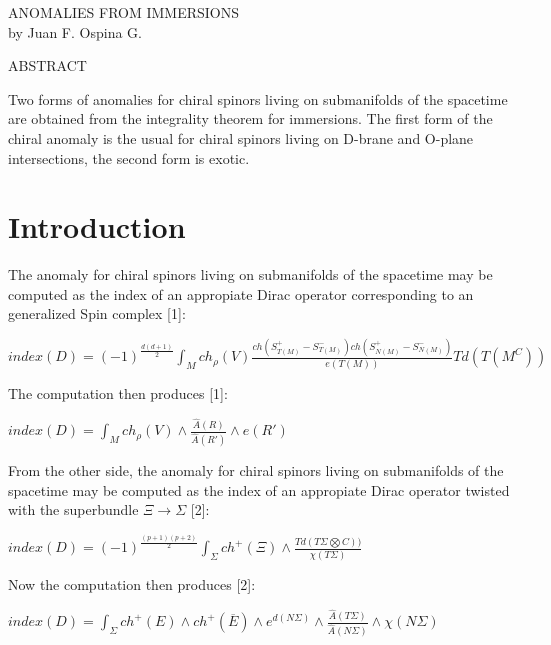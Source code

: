 \documentclass[a4paper,a4paper]{article}
\begin{document}
\begin{center}
ANOMALIES FROM IMMERSIONS\\ [.25in] by Juan F. Ospina G.
\end{center}



\begin{center}
ABSTRACT \\ [.25in]
\end{center}

Two forms of anomalies for chiral spinors living on submanifolds of the spacetime are
obtained from the integrality theorem for immersions. The first form of the chiral
anomaly is the usual for chiral spinors living on D-brane and O-plane intersections,
the second form is exotic.

\section{Introduction}
 \setlength{\baselineskip}{20pt}

The anomaly for chiral spinors living on submanifolds of the spacetime may be computed
as the index of an appropiate Dirac operator corresponding to an generalized Spin
complex [1]:
\begin{center}
\setlength{\baselineskip}{40pt}
 {  $  index(D)
=(-1)^{\frac{d(d+1)}{2}}\int_{M}ch_{\rho}(V)\frac{ch(S^{+}_{T(M)}-S^{-}_{T(M)})ch(S^{+}_{N(M)}-S^{-}_{N(M)})}{e(T(M))}Td(T(M^{C}))$
}
\end{center}

The computation then produces  [1]:
\begin{center}
\setlength{\baselineskip}{40pt}
 {  $  index(D)
=\int_{M}ch_{\rho}(V)\wedge\frac{\hat{A}(R)}{\hat{A}(R')}\wedge{e(R')}$ }
\end{center}





From the other side, the anomaly for chiral spinors living on submanifolds of the
spacetime may be computed as the index of an appropiate Dirac operator twisted with
the superbundle ${\Xi}\rightarrow{\Sigma}$ [2]:

\begin{center}
\setlength{\baselineskip}{40pt}
 {  $  index(D)
=(-1)^{\frac{(p+1)(p+2)}{2}}\int_{\Sigma}ch^{+}(\Xi)\wedge\frac{Td(T{\Sigma}{\bigotimes}C))}{\chi(T\Sigma)}$
}
\end{center}
Now the computation then produces [2]:
\begin{center}
\setlength{\baselineskip}{40pt}
 {  $  index(D)
=\int_{\Sigma}ch^{+}(E)\wedge{ch^{+}(\overline{E})}\wedge{e^{d(N\Sigma)}}\wedge\frac{\hat{A}(T\Sigma)}{\hat{A}(N\Sigma)}\wedge{\chi(N\Sigma)}$
}
\end{center}
\end{document}
